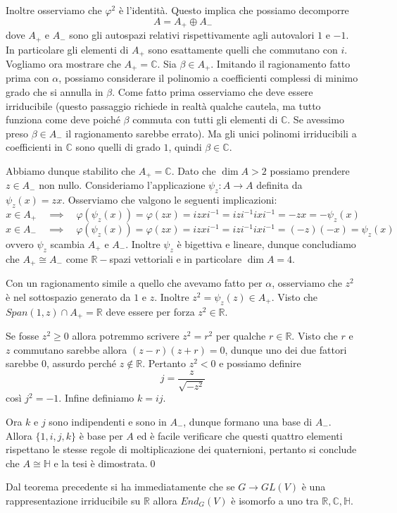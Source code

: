 \documentclass[11pt]{article}
\theoremstyle{plain}
\theoremstyle{definition}
\theoremstyle{remark}
\newcommand{\C}{\mathbb{C}}
\newcommand{\R}{\mathbb{R}}
\newcommand{\HH}{\mathbb{H}}
\begin{document}
Inoltre osserviamo che $\varphi^2$ è l'identità. Questo implica che possiamo decomporre
\[ A = A_+ \oplus A_-\] dove $A_+$ e $A_-$ sono gli autospazi relativi rispettivamente agli autovalori $1$ e $-1$.
In particolare gli elementi di $A_+$ sono esattamente quelli che commutano con $i$.
Vogliamo ora mostrare che $A_+ = \C$.
Sia $\beta\in A_+$. Imitando il ragionamento fatto prima con $\alpha$, possiamo considerare il polinomio a coefficienti complessi di minimo grado
che si annulla in $\beta$. Come fatto prima osserviamo che deve essere irriducibile (questo passaggio richiede in realtà qualche cautela,
ma tutto funziona come deve poiché $\beta$ commuta con tutti gli elementi di $\C$. Se avessimo preso $\beta\in A_-$ il ragionamento sarebbe errato).
Ma gli unici polinomi irriducibili a coefficienti in $\C$ sono quelli di grado $1$, quindi $\beta\in\C$.

Abbiamo dunque stabilito che $A_+ = \C$. Dato che $\dim A > 2$ possiamo prendere $z\in A_-$ non nullo.
Consideriamo l'applicazione $\psi_z:A\to A$ definita da $\psi_z(x) = zx$.
Osserviamo che valgono le seguenti implicazioni:
\[ x\in A_+ \quad\implies\quad \varphi(\psi_z(x)) = \varphi(zx) = izxi^{-1} = izi^{-1}ixi^{-1} = -zx = -\psi_z(x)\]
\[ x\in A_- \quad\implies\quad \varphi(\psi_z(x)) = \varphi(zx) = izxi^{-1} = izi^{-1}ixi^{-1} = (-z)(-x) = \psi_z(x)\]
ovvero $\psi_z$ scambia $A_+$ e $A_-$. Inoltre $\psi_z$ è bigettiva e lineare, dunque concludiamo che $A_+\cong A_-$ come $\R-$spazi vettoriali e in particolare $\dim A = 4$.

Con un ragionamento simile a quello che avevamo fatto per $\alpha$, osserviamo che $z^2$ è nel sottospazio generato da $1$ e $z$. Inoltre $z^2=\psi_z(z)\in A_+$.
Visto che $Span(1,z) \cap A_+ = \R$ deve essere per forza $z^2\in\R$.

Se fosse $z^2 \ge 0$ allora potremmo scrivere $z^2=r^2$ per qualche $r\in\R$.
Visto che $r$ e $z$ commutano sarebbe allora $(z-r)(z+r)=0$, dunque uno dei due fattori sarebbe $0$, assurdo perché $z\not\in\R$. Pertanto $z^2 < 0$ e possiamo definire
\[j = \frac{z}{\sqrt{-z^2}}\]
così $j^2 = -1$. Infine definiamo $k = ij$.

Ora $k$ e $j$ sono indipendenti e sono in $A_-$, dunque formano una base di $A_-$. Allora $\{1,i,j,k\}$ è base per $A$ ed è facile
verificare che questi quattro elementi rispettano le stesse regole di moltiplicazione dei quaternioni, pertanto si conclude che $A\cong\HH$ e la tesi è dimostrata.\qed

Dal teorema precedente si ha immediatamente che se $G\to GL(V)$ è una rappresentazione irriducibile su $\R$ allora $End_G(V)$ è isomorfo a uno
tra $\R, \C, \HH$.
\end{document}
